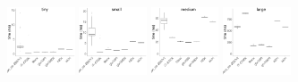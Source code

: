 \documentclass[../document.tex]{subfiles}
\begin{document}
\begin{figure}
	\begin{subfigure}{0.09\textwidth} \label{fig:time-lud} \vspace{5mm}\end{subfigure}
	\begin{subfigure}{0.9\textwidth}
		\includegraphics[width=0.22\textwidth]{figures/time-results/generate_lud_tiny_boxplot-1}
		\includegraphics[width=0.22\textwidth]{figures/time-results/generate_lud_small_boxplot-1}
		\includegraphics[width=0.22\textwidth]{figures/time-results/generate_lud_medium_boxplot-1}
		\includegraphics[width=0.22\textwidth]{figures/time-results/generate_lud_large_boxplot-1}
	\end{subfigure}
	

\end{figure}
\end{document}

